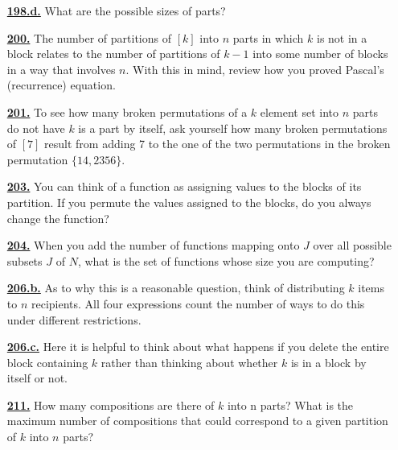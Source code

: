 \documentclass[10pt,]{book}
\theoremstyle{plain}
\theoremstyle{definition}
\theoremstyle{definition}
\theoremstyle{definition}
\numberwithin{equation}{chapter}
\begin{document}
\begin{itemize}[itemsep=1em]
\hypertarget{a-198.d}{}\item[\textbf{\hyperref[task-212]{198.d.}}]
\hypertarget{p-1085}{}%
What are the possible sizes of parts?%

\hypertarget{a-200}{}\item[\textbf{\hyperref[secondstirlingrecurrence]{200.}}]
\hypertarget{p-1092}{}%
The number of partitions of \([k]\) into \(n\) parts in which \(k\) is not in a block relates to the number of partitions of \(k-1\) into some number of blocks in a way that involves \(n\). With this in mind, review how you proved Pascal's (recurrence) equation.%

\hypertarget{a-201}{}\item[\textbf{\hyperref[activity-194]{201.}}]
\hypertarget{p-1095}{}%
To see how many broken permutations of a \(k\) element set into \(n\) parts do not have \(k\) is a part by itself, ask yourself how many broken permutations of \([7]\) result from adding 7 to the one of the two permutations in the broken permutation \(\{14, 2356\}\).%

\hypertarget{a-203}{}\item[\textbf{\hyperref[activity-196]{203.}}]
\hypertarget{p-1101}{}%
You can think of a function as assigning values to the blocks of its partition. If you permute the values assigned to the blocks, do you always change the function?%

\hypertarget{a-204}{}\item[\textbf{\hyperref[Stirlingfalling]{204.}}]
\hypertarget{p-1105}{}%
When you add the number of functions mapping onto \(J\) over all possible subsets \(J\) of \(N\), what is the set of functions whose size you are computing?%

\hypertarget{a-206.b}{}\item[\textbf{\hyperref[task-216]{206.b.}}]
\hypertarget{p-1114}{}%
As to why this is a reasonable question, think of distributing \(k\) items to \(n\) recipients.  All four expressions count the number of ways to do this under different restrictions.%

\hypertarget{a-206.c}{}\item[\textbf{\hyperref[task-217]{206.c.}}]
\hypertarget{p-1116}{}%
Here it is helpful to think about what happens if you delete the entire block containing \(k\) rather than thinking about whether \(k\) is in a block by itself or not.%

\hypertarget{a-211}{}\item[\textbf{\hyperref[activity-204]{211.}}]
\hypertarget{p-1134}{}%
How many compositions are there of \(k\) into n parts? What is the maximum number of compositions that could correspond to a given partition of \(k\) into \(n\) parts?%


\end{itemize}
\end{document}

